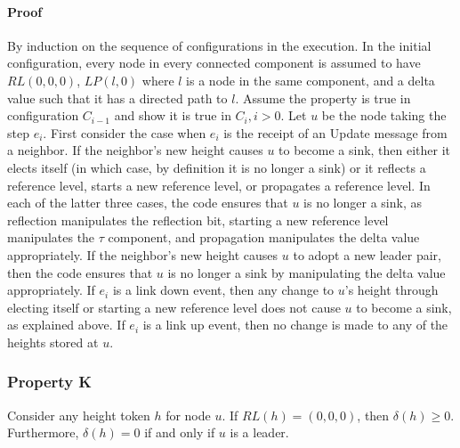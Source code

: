 \documentclass{article}
\begin{document}
\paragraph{Proof}
By induction on the sequence of configurations in the execution. In the initial configuration, every node in every connected component is assumed to have $RL(0,0,0)$, $LP(l, 0)$ where $l$ is a node in the same component, and a delta value such that it has a directed path to $l$. Assume the property is true in configuration $C_{i − 1}$ and show it is true in $C_i, i > 0$. Let $u$ be the node taking the step $e_i$.
First consider the case when $e_i$ is the receipt of an Update message from a neighbor. If the neighbor’s new height causes $u$ to become a sink, then either it elects itself (in which case, by definition it is no longer a sink) or it reflects a reference level, starts a new reference level, or propagates a reference level. In each of the latter three cases, the code ensures that $u$ is no longer a sink, as reflection manipulates the reflection bit, starting a new reference level manipulates the $\tau $ component, and propagation manipulates the delta value appropriately. If the neighbor’s new height causes $u$ to adopt a new leader pair, then the code ensures that $u$ is no longer a sink by manipulating the delta value appropriately. If $e_i$ is a link down event, then any change to $u$’s height through electing itself or starting a new reference level does not cause $u$ to become a sink, as explained above. If $e_i$ is a link up event, then no change is made to any of the heights stored at $u$.
\subsubsection{Property K} 
Consider any height token $h$ for node $u$. If $RL(h) = (0, 0, 0)$, then $\delta(h) \geq 0$. Furthermore, $\delta (h) = 0$ if and only if $u$ is a leader.
\end{document}
